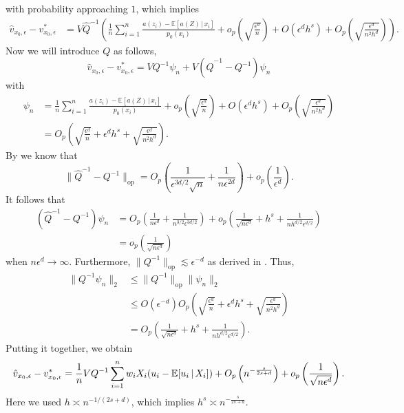 \documentclass[11pt]{article}
\begin{document}
with probability approaching $1$, which implies
\begin{align*}
    \hat{v}_{x_0, \epsilon} - v^*_{x_0, \epsilon} &= V\hat{Q}^{-1}\left(\frac{1}{n}\sum_{i = 1}^n\frac{a(z_i) - \mathbb{E}[a(Z)\,|\, x_i]}{p_0(x_i)}+ o_p\left(\sqrt{\frac{\epsilon^d}{n}}\right) + O(\epsilon^dh^s) + O_p\left( \sqrt{\frac{\epsilon^d}{n^2h^d}}\right)\right).
\end{align*}
Now we will introduce $Q$ as follows,
\begin{equation*}
    \hat{v}_{x_0, \epsilon} - v^*_{x_0, \epsilon} = VQ^{-1}\psi_n + V(\hat{Q}^{-1} - Q^{-1})\psi_n
\end{equation*}
with
\begin{align*}
    \psi_n &= \frac{1}{n}\sum_{i = 1}^n\frac{a(z_i) -\mathbb{E}[a(Z)\,|\, x_i]}{p_0(x_i)} + o_p\left(\sqrt{\frac{\epsilon^d}{n}}\right) +   O(\epsilon^dh^s) + O_p\left( \sqrt{\frac{\epsilon^d}{n^2h^d}}\right) \\
    &= O_p\left(\sqrt{\frac{\epsilon^d}{n}} + \epsilon^dh^s + \sqrt{\frac{\epsilon^d}{n^2h^d}}\right).
\end{align*}
By  we know that 
\[\|\hat{Q}^{-1} - Q^{-1}\|_{\text{op}} = O_p\left(\frac{1}{\epsilon^{3d/2}\sqrt{n}} + \frac{1}{n\epsilon^{2d}}\right) + o_p\left(\frac{1}{\epsilon^d}\right).\]
It follows that 
\begin{align*}
    (\hat{Q}^{-1} - Q^{-1})\psi_n &= O_p\left(\frac{1}{n\epsilon^{d}} + \frac{1}{n^{3/2}\epsilon^{3d/2}}\right) + o_p\left(\frac{1}{\sqrt{n\epsilon^d}} + h^s + \frac{1}{nh^{d/2}\epsilon^{d/2}}\right) \\
    &= o_p\left(\frac{1}{\sqrt{n\epsilon^d}}\right)
\end{align*}
when $n\epsilon^d \rightarrow \infty$. Furthermore, $\|Q^{-1}\|_{\text{op}} \lesssim \epsilon^{-d}$ as derived in . Thus,
\begin{align*}
    \|Q^{-1}\psi_n\|_2 &\leq \|Q^{-1}\|_{\text{op}}\|\psi_n\|_2 \\
    &\leq O(\epsilon^{-d})O_p\left(\sqrt{\frac{\epsilon^d}{n}} + \epsilon^dh^s + \sqrt{\frac{\epsilon^d}{n^2h^d}}\right) \\
    &= O_p\left(\frac{1}{\sqrt{n\epsilon^d}} + h^s + \frac{1}{nh^{d/2}\epsilon^{d/2}}\right).
\end{align*}
Putting it together, we obtain
\begin{equation}
    \hat{v}_{x_0, \epsilon} - v^*_{x_0, \epsilon} = \frac{1}{n}VQ^{-1}\sum_{i = 1}^n w_iX_i(u_i - \mathbb{E}[u_i\,|\,X_i]) \\
    + O_p\left(n^{-\frac{s}{2s+d}}\right) + o_p\left(\frac{1}{\sqrt{n\epsilon^{d}}}\right).
\end{equation}
Here we used $h \asymp n^{-1/(2s+d)}$, which implies $h^s \asymp n^{-\frac{s}{2s+d}}$.
\end{document}
